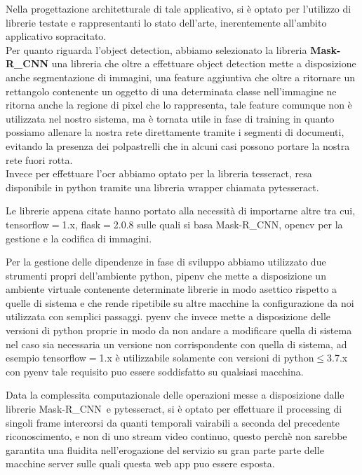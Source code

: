 \documentclass[12pt,a4paper]{article}
\newcommand{\mrcnn}{Mask-R\_CNN}
\begin{document}
Nella progettazione architetturale di tale applicativo, si è optato per
l'utilizzo di librerie testate e rappresentanti lo stato dell'arte,
inerentemente all'ambito applicativo sopracitato.\\
Per quanto riguarda l'object detection, abbiamo selezionato la libreria
\textbf{\mrcnn} una libreria che oltre a effettuare object detection mette a
disposizione anche segmentazione di immagini, una feature aggiuntiva che
oltre a ritornare un rettangolo contenente un oggetto di una determinata
classe nell'immagine ne ritorna anche la regione di pixel che lo
rappresenta, tale feature comunque non è utilizzata nel nostro sistema,
ma è tornata utile in fase di training in quanto possiamo allenare la
nostra rete direttamente tramite i segmenti di documenti, evitando la
presenza dei polpastrelli che in alcuni casi possono portare la nostra
rete fuori rotta.\\
Invece per effettuare l'ocr abbiamo optato per la libreria tesseract,
resa disponibile in python tramite una libreria wrapper chiamata
pytesseract.

Le librerie appena citate hanno portato alla necessità di importarne
altre tra cui, tensorflow$=$1.x, flask$=$2.0.8 sulle quali si basa
\mrcnn, opencv per la gestione e la codifica di immagini.

Per la gestione delle dipendenze in fase di sviluppo abbiamo utilizzato
due strumenti propri dell'ambiente python, pipenv che mette a
disposizione un ambiente virtuale contenente determinate librerie in
modo asettico rispetto a quelle di sistema e che rende ripetibile su
altre macchine la configurazione da noi utilizzata con semplici
passaggi. pyenv che invece mette a disposizione delle versioni di python
proprie in modo da non andare a modificare quella di sistema nel caso
sia necessaria un versione non corrispondente con quella di sistema, ad
esempio tensorflow$=$1.x è utilizzabile solamente con versioni di
python$\leq$3.7.x con pyenv tale requisito puo essere soddisfatto su
qualsiasi macchina.

Data la complessita computazionale delle operazioni messe a disposizione
dalle librerie \mrcnn\ e pytesseract, si è optato per effettuare il
processing di singoli frame intercorsi da quanti temporali vairabili a
seconda del precedente riconoscimento, e non di uno stream video
continuo, questo perchè non sarebbe garantita una fluidita
nell'erogazione del servizio su gran parte parte delle macchine server
sulle quali questa web app puo essere esposta.
\end{document}
